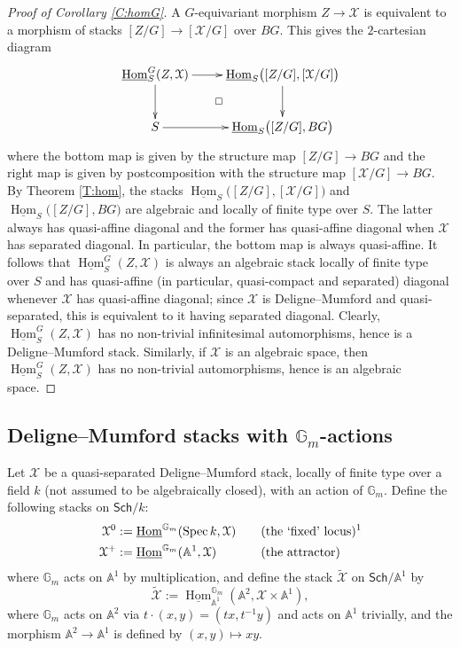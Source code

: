 \documentclass[a4paper]{amsart}
\theoremstyle{plain}
\theoremstyle{definition}
\theoremstyle{remark}
\numberwithin{equation}{section}
\newcommand{\GG}{\mathbb{G}}
\renewcommand\AA{\mathbb{A}}
\newcommand\cX{\mathcal{X}}
\DeclareMathOperator{\Spec}{Spec}
\renewcommand{\tilde}{\widetilde}
\DeclareMathOperator{\Hom}{Hom}
\newcommand{\Sch}{\mathsf{Sch}}
\begin{document}
\begin{proof} [Proof of Corollary \ref{C:homG}]
 A $G$-equivariant morphism $Z\to \cX$ is equivalent to a morphism
 of stacks $[Z/G]\to [\cX/G]$ over $BG$. This gives the $2$-cartesian diagram
 \begin{equation*}%
 \xymatrix{
  \underline{\Hom}_S^G(Z,\cX)\ar[r]\ar[d] & \underline{\Hom}_S\bigl([Z/G],[\cX/G]\bigr)\ar[d] \\
  S\ar[r] & \underline{\Hom}_S\bigl([Z/G],BG\bigr)\ar@{}[ul]|\square
 }
 \end{equation*}
 where the bottom map is given by the structure map $[Z/G]\to BG$
 and the right map is given by postcomposition with the structure map
 $[\cX/G]\to BG$. By Theorem \ref{T:hom}, the stacks
 $\underline{\Hom}_S\bigl([Z/G],[\cX/G]\bigr)$ and
 $\underline{\Hom}_S\bigl([Z/G],BG\bigr)$ are algebraic and locally
 of finite type over $S$. The latter always has quasi-affine diagonal and the former has quasi-affine diagonal when $\cX$ has separated diagonal. In particular,
 the bottom map is always quasi-affine. It follows that
 $\underline{\Hom}_S^G(Z,\cX)$ is always an algebraic stack locally
 of finite type over $S$ and has quasi-affine (in particular, quasi-compact and separated) diagonal whenever $\cX$ has quasi-affine diagonal; since $\cX$ is Deligne--Mumford and quasi-separated, this is equivalent to it having separated diagonal. Clearly, $\underline{\Hom}_S^G(Z,\cX)$ has no
 non-trivial infinitesimal automorphisms, hence is a Deligne--Mumford stack. Similarly, if $\cX$ is an algebraic space, then $\underline{\Hom}_S^G(Z,\cX)$ has no
 non-trivial automorphisms, hence is an algebraic space. 
\end{proof}


\subsection{Deligne--Mumford stacks with $\GG_m$-actions} \label{A:drinfeld}
Let $\cX$ be a quasi-separated Deligne--Mumford stack, locally of finite type over a field $k$ (not assumed to be algebraically closed), with an action of $\GG_m$.
Define the following stacks on $\Sch/k$:
\[
\begin{aligned}
\cX^0 		& := \underline{\Hom}^{\GG_m}(\Spec k, \cX) & \quad & \text{(the `fixed' locus)\footnotemark} \\
\cX^+ 		& := \underline{\Hom}^{\GG_m}(\AA^1,\cX) & \quad & \text{(the attractor)}
\end{aligned}
\]
where $\GG_m$ acts on $\AA^1$ by multiplication, and define the stack $\tilde{\cX}$ on $\Sch/\AA^1$ by
\[
\tilde{\cX} 	 := \underline{\Hom}_{\AA^1}^{\GG_m}(\AA^2 , \cX \times \AA^1),
\]
where $\GG_m$ acts on $\AA^2$ via $t \cdot (x,y) = (tx, t^{-1} y)$ and acts on $\AA^1$ trivially, and the morphism $\AA^2 \to \AA^1$ is defined by $(x,y) \mapsto xy$.
\end{document}
